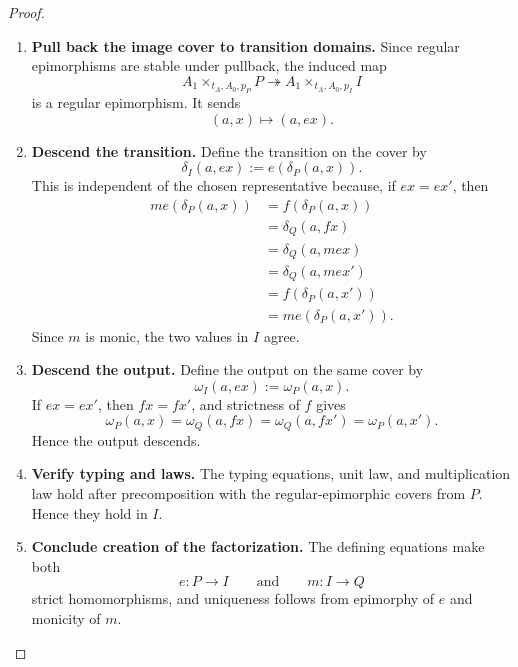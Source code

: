 \begin{proof}
    \leavevmode
    \begin{enumerate}
        \item \textbf{Pull back the image cover to transition domains.}
        Since regular epimorphisms are stable under pullback, the induced map
        \[
            A_1\times_{t_A,A_0,p_P}P
            \twoheadrightarrow
            A_1\times_{t_A,A_0,p_I}I
        \]
        is a regular epimorphism. It sends
        \[
            (a,x)\longmapsto(a,ex).
        \]

        \item \textbf{Descend the transition.}
        Define the transition on the cover by
        \[
            \delta_I(a,ex):=e(\delta_P(a,x)).
        \]
        This is independent of the chosen representative because, if \(ex=ex'\),
        then
        \[
        \begin{aligned}
            m e(\delta_P(a,x))
            &=
            f(\delta_P(a,x)) \\
            &=
            \delta_Q(a,fx) \\
            &=
            \delta_Q(a,mex) \\
            &=
            \delta_Q(a,mex') \\
            &=
            f(\delta_P(a,x')) \\
            &=
            m e(\delta_P(a,x')).
        \end{aligned}
        \]
        Since \(m\) is monic, the two values in \(I\) agree.

        \item \textbf{Descend the output.}
        Define the output on the same cover by
        \[
            \omega_I(a,ex):=\omega_P(a,x).
        \]
        If \(ex=ex'\), then \(fx=fx'\), and strictness of \(f\) gives
        \[
            \omega_P(a,x)=\omega_Q(a,fx)=\omega_Q(a,fx')=\omega_P(a,x').
        \]
        Hence the output descends.

        \item \textbf{Verify typing and laws.}
        The typing equations, unit law, and multiplication law hold after
        precomposition with the regular-epimorphic covers from \(P\). Hence they
        hold in \(I\).

        \item \textbf{Conclude creation of the factorization.}
        The defining equations make both
        \[
            e:P\to I
            \qquad\text{and}\qquad
            m:I\to Q
        \]
        strict homomorphisms, and uniqueness follows from epimorphy of \(e\)
        and monicity of \(m\).
    \end{enumerate}
\end{proof}

